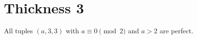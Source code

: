 \section{Thickness 3}

\begin{con}
\label{con:3x3xeven}
All tuples $(a,3,3)$ with $a \equiv 0 \pmod 2$ and $a > 2$ are perfect. 
\end{con}


